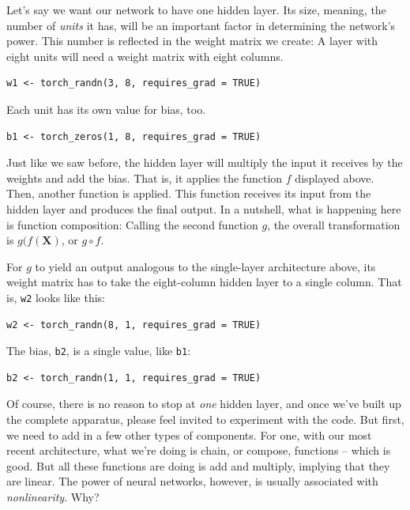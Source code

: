 \documentclass[
  letterpaper,
]{krantz}
\begin{document}
Let's say we want our network to have one hidden
layer. Its size, meaning, the number of \emph{units}
it has, will be an important factor in determining the network's power.
This number is reflected in the weight matrix we create: A layer with
eight units will need a weight matrix with eight columns.

\begin{verbatim}
w1 <- torch_randn(3, 8, requires_grad = TRUE)
\end{verbatim}

Each unit has its own value for bias, too.

\begin{verbatim}
b1 <- torch_zeros(1, 8, requires_grad = TRUE)
\end{verbatim}

Just like we saw before, the hidden layer will multiply the input it
receives by the weights and add the bias. That is, it applies the
function \(f\) displayed above. Then, another function is applied. This
function receives its input from the hidden layer and produces the final
output. In a nutshell, what is happening here is function composition:
Calling the second function \(g\), the overall transformation is
\(g(f(\mathbf{X})\), or \(g \circ f\).

For \(g\) to yield an output analogous to the single-layer architecture
above, its weight matrix has to take the eight-column hidden layer to a
single column. That is, \texttt{w2} looks like this:

\begin{verbatim}
w2 <- torch_randn(8, 1, requires_grad = TRUE)
\end{verbatim}

The bias, \texttt{b2}, is a single value, like \texttt{b1}:

\begin{verbatim}
b2 <- torch_randn(1, 1, requires_grad = TRUE)
\end{verbatim}

Of course, there is no reason to stop at \emph{one} hidden layer, and
once we've built up the complete apparatus, please feel invited to
experiment with the code. But first, we need to add in a few other types
of components. For one, with our most recent architecture, what we're
doing is chain, or compose, functions -- which is good. But all these
functions are doing is add and multiply, implying that they are linear.
The power of neural networks, however, is usually associated with
\emph{nonlinearity}. Why?
\end{document}
